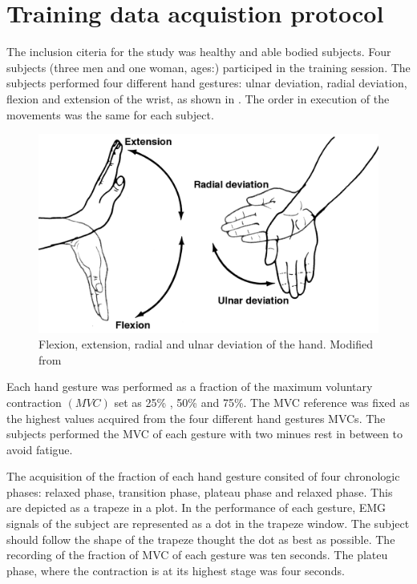 \section{Training data acquistion protocol}

The inclusion citeria for the study was healthy and able bodied subjects. Four subjects (three men and one woman, ages:) participed in the training session. The subjects performed four different hand gestures: ulnar deviation, radial deviation, flexion and extension of the wrist, as shown in . The order in execution of the movements was the same for each subject. 

\begin{figure}[H]                    
	\includegraphics[width=.5\textwidth]{figures/Anatomy/wrist_move}  %
	\caption{Flexion, extension, radial and ulnar deviation of the hand. Modified from  \cite{hamilton2008}}
	\label{fig:handgest}  %
\end{figure}


Each hand gesture was performed as a fraction of the maximum voluntary contraction $\left( MVC\right)$ set as 25\% , 50\% and 75\%. The MVC reference was fixed as the highest values acquired from the four different hand gestures MVCs. The subjects performed the MVC of each gesture with two minues rest in between to avoid fatigue.

The acquisition of the fraction of each hand gesture consited of four chronologic phases: relaxed phase, transition phase, plateau phase and relaxed phase. This are depicted as a trapeze in a plot. In the performance of each gesture, EMG signals of the subject are represented as a dot in the trapeze window. The subject should follow the shape of the trapeze thought the dot as best as possible. The recording of the fraction of MVC of each gesture was ten seconds. The plateu phase, where the contraction is at its highest stage was four seconds.
  
